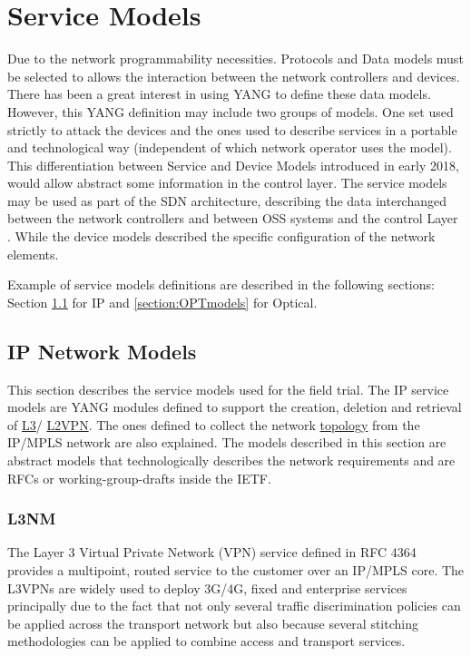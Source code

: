 \documentclass[a4paper,fleqn]{cas-dc}
\begin{document}
\section{Service Models}
\label{section:models}

Due to the network programmability necessities. Protocols and Data models must be selected to allows the interaction between the network controllers and devices. There has been a great interest in using YANG to define these data models. However, this YANG definition may include two groups of models. One set used strictly to attack the devices and the ones used to describe services in a portable and technological way (independent of which network operator uses the model). 
This differentiation between Service and Device Models introduced in early 2018, would allow abstract some information in the control layer. The service models may be used as part of the SDN architecture, describing the data interchanged between the network controllers and between OSS systems and the control Layer \cite{wu2017service}. While the device models described the specific configuration of the network elements. 

Example of service models definitions are described in the following sections: Section \cref{section:IPmodels} for IP and \cref{section:OPTmodels} for Optical.

\subsection{IP Network Models}
\label{section:IPmodels}

This section describes the service models used for the field trial. The IP service models are YANG modules defined to support the creation, deletion and retrieval of \hyperref[section:l3nm]{L3}/ \hyperref[section:l2nm]{L2VPN}. The ones defined to collect the network \hyperref[subsection:IPtopo]{topology} from the IP/MPLS network are also explained. The models described in this section are abstract models that technologically describes the network requirements and are RFCs or working-group-drafts inside the IETF.

\subsubsection{L3NM}
\label{section:l3nm}
The Layer 3 Virtual Private Network (VPN) service defined in RFC 4364 \cite{rosen2006rfc} provides a multipoint, routed service to the customer over an IP/MPLS core. The L3VPNs are widely used to deploy 3G/4G, fixed and enterprise services principally due to the fact that not only several traffic discrimination policies can be applied across the transport network but also because several stitching methodologies can be applied to combine access and transport services. 
\end{document}
